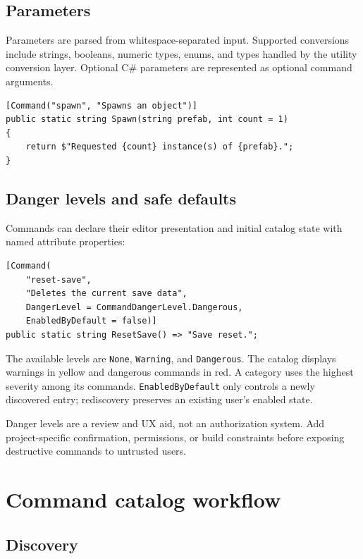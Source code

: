 \documentclass[11pt,a4paper]{article}
\begin{document}
\subsection{Parameters}

Parameters are parsed from whitespace-separated input. Supported conversions include strings, booleans, numeric types, enums, and types handled by the utility conversion layer. Optional C\# parameters are represented as optional command arguments.

\begin{lstlisting}[style=csharp]
[Command("spawn", "Spawns an object")]
public static string Spawn(string prefab, int count = 1)
{
    return $"Requested {count} instance(s) of {prefab}.";
}
\end{lstlisting}

\subsection{Danger levels and safe defaults}

Commands can declare their editor presentation and initial catalog state with named attribute properties:

\begin{lstlisting}[style=csharp]
[Command(
    "reset-save",
    "Deletes the current save data",
    DangerLevel = CommandDangerLevel.Dangerous,
    EnabledByDefault = false)]
public static string ResetSave() => "Save reset.";
\end{lstlisting}

The available levels are \texttt{None}, \texttt{Warning}, and \texttt{Dangerous}. The catalog displays warnings in yellow and dangerous commands in red. A category uses the highest severity among its commands. \texttt{EnabledByDefault} only controls a newly discovered entry; rediscovery preserves an existing user's enabled state.

\begin{safety}
Danger levels are a review and UX aid, not an authorization system. Add project-specific confirmation, permissions, or build constraints before exposing destructive commands to untrusted users.
\end{safety}

\section{Command catalog workflow}

\subsection{Discovery}
\end{document}
